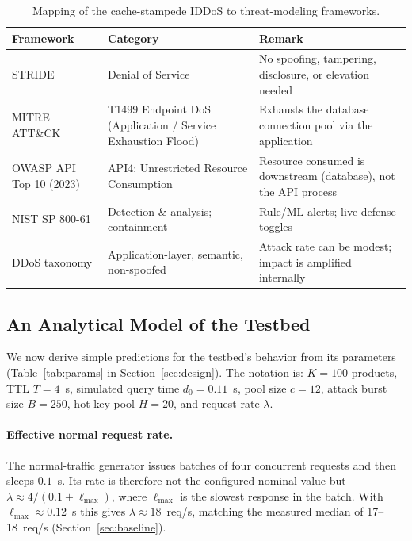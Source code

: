 \documentclass[preprint,12pt]{elsarticle}
\begin{document}
\begin{table}[t]
\centering
\caption{Mapping of the cache-stampede IDDoS to threat-modeling frameworks.}
\label{tab:frameworks}
\small
\begin{tabularx}{\linewidth}{@{}L{3.2cm}L{4.4cm}Y@{}}
\toprule
Framework & Category & Remark \\
\midrule
STRIDE \cite{shostack2014} & Denial of Service & No spoofing, tampering, disclosure, or elevation needed \\
MITRE ATT\&CK \cite{mitret1499} & T1499 Endpoint DoS (Application / Service Exhaustion Flood) & Exhausts the database connection pool via the application \\
OWASP API Top 10 (2023) \cite{owaspapi2023} & API4: Unrestricted Resource Consumption & Resource consumed is downstream (database), not the API process \\
NIST SP 800-61 \cite{nist80061} & Detection \& analysis; containment & Rule/ML alerts; live defense toggles \\
DDoS taxonomy \cite{mirkovic2004} & Application-layer, semantic, non-spoofed & Attack rate can be modest; impact is amplified internally \\
\bottomrule
\end{tabularx}
\end{table}

\subsection{An Analytical Model of the Testbed}
\label{sec:model}
We now derive simple predictions for the testbed's behavior from its parameters
(Table~\ref{tab:params} in Section~\ref{sec:design}). The notation is: $K=100$ products,
TTL $T=4$~s, simulated query time $d_0=0.11$~s, pool size $c=12$, attack burst size
$B=250$, hot-key pool $H=20$, and request rate $\lambda$.

\paragraph{Effective normal request rate.} The normal-traffic generator issues
batches of four concurrent requests and then sleeps $0.1$~s. Its rate is therefore
not the configured nominal value but
$\lambda \approx 4/(0.1 + \ell_{\max})$, where $\ell_{\max}$ is the slowest response in
the batch. With $\ell_{\max}\approx0.12$~s this gives $\lambda\approx18$~req/s,
matching the measured median of 17--18~req/s (Section~\ref{sec:baseline}).
\end{document}
